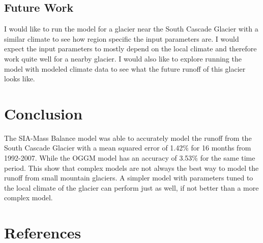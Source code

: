 \documentclass{article}
\begin{document}
\subsection{Future Work}
I would like to run the model for a glacier near the South Cascade Glacier with a similar climate to see how region specific the input 
parameters are. I would expect the input parameters to mostly depend on the local climate and therefore work quite well for a nearby glacier. 
I would also like to explore running the model with modeled climate data to see what the future runoff of this glacier looks like.
\section{Conclusion}
The SIA-Mass Balance model was able to accurately model the runoff from the South Cascade Glacier with a mean squared error of 1.42\% for 16 
months from 1992-2007. While the OGGM model has an accuracy of 3.53\% for the same time period. This show that complex models are not always 
the best way to model the runoff from small mountain glaciers. A simpler model with parameters tuned to the local climate of the glacier can 
perform just as well, if not better than a more complex model. 

\section{References}
\end{document}
